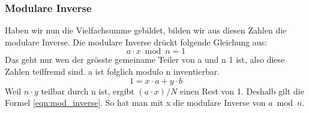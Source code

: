 \subsubsection{Modulare Inverse}
Haben wir nun die Vielfachsumme gebildet, bilden wir aus diesen Zahlen die modulare Inverse. Die modulare Inverse drückt folgende Gleichung aus:
%
\begin{equation}
 a \cdot x \bmod n = 1
 \label{eqn:mod_inverse}
\end{equation}
%
Das geht nur wen der grösste gemeiname Teiler von a und n 1 ist, also diese Zahlen teilfremd sind. a ist folglich modulo n inventierbar.
%
\begin{equation}
  1 = x \cdot a + y \cdot b
\end{equation}
%
Weil $n \cdot y$ teilbar durch n ist, ergibt $ (a \cdot x) / N $ einen Rest von 1. Deshalb gilt die Formel \ref{eqn:mod_inverse}. So hat man mit x die modulare Inverse von $ a \bmod n $.
